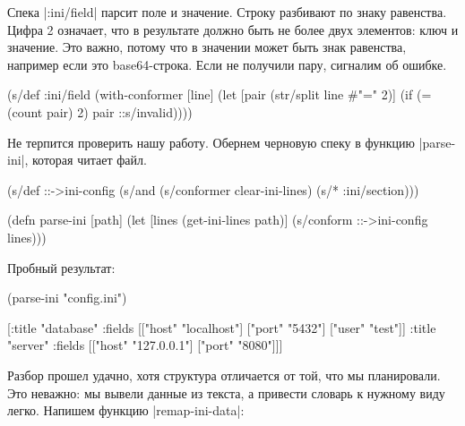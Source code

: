 \begin{english}
\end{english}


Спека \spverb|:ini/field| парсит поле и значение. Строку разбивают по знаку
равенства. Цифра 2 означает, что в результате должно быть не более двух
элементов: ключ и значение. Это важно, потому что в значении может быть знак
равенства, например если это base64-строка. Если не получили пару, сигналим об
ошибке.

\begin{english}
  \begin{clojure}
(s/def :ini/field
  (with-conformer [line]
    (let [pair (str/split line #"=" 2)]
      (if (= (count pair) 2)
        pair
        ::s/invalid))))
  \end{clojure}
\end{english}

Не терпится проверить нашу работу. Обернем черновую спеку в функцию
\spverb|parse-ini|, которая читает файл.

\begin{english}
  \begin{clojure}
(s/def ::->ini-config
  (s/and
   (s/conformer clear-ini-lines)
   (s/* :ini/section)))

(defn parse-ini [path]
  (let [lines (get-ini-lines path)]
    (s/conform ::->ini-config lines)))
  \end{clojure}
\end{english}

\noindent
Пробный результат:

\begin{english}
  \begin{clojure}
(parse-ini "config.ini")

[{:title "database"
  :fields [["host" "localhost"]
           ["port" "5432"]
           ["user" "test"]]}
 {:title "server"
  :fields [["host" "127.0.0.1"]
           ["port" "8080"]]}]
  \end{clojure}
\end{english}

Разбор прошел удачно, хотя структура отличается от той, что мы планировали. Это
неважно: мы вывели данные из текста, а привести словарь к нужному виду
легко. Напишем функцию \spverb|remap-ini-data|:


